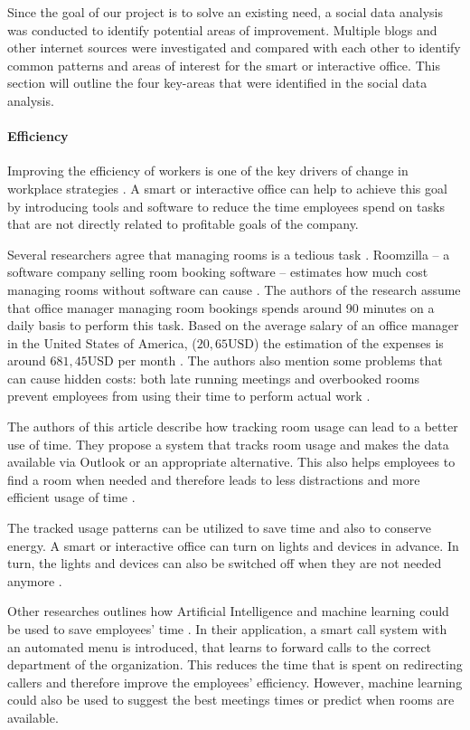 Since the goal of our project is to solve an existing need, a social data analysis was conducted to 
identify potential areas of improvement. Multiple blogs and other internet sources were investigated 
and compared with each other to identify common patterns and areas of interest for the smart or 
interactive office. This section will outline the four key-areas that were identified in the social 
data analysis.

\paragraph{Efficiency}
\label{sec:sda-efficiency}
Improving the efficiency of workers is one of the key drivers of change in workplace strategies 
 \cite{hub13}. A smart or interactive office can help to achieve this goal by introducing tools and software to reduce the time employees spend on tasks that are not directly related to profitable 
goals of the company.

Several researchers agree that managing rooms is a tedious task \cite{iotagenda} \cite{roomzilla9}. 
Roomzilla -- a software company selling room booking software -- estimates how 
much cost managing rooms without software can cause \cite{roomzilla9}. The authors of the research assume that office manager managing room bookings spends around 90 minutes on a daily basis to perform this task. Based on the average salary of an office 
manager in the United States of America, (\(20,65\text{USD}\)) the estimation of the expenses is around \(681,45\text{USD}\) 
per month \cite{roomzilla9}. The authors also mention some problems that can cause hidden costs: both late running 
meetings and overbooked rooms prevent employees from using their time to perform actual work \cite{roomzilla9}. 

The authors of this article describe how tracking room usage can lead to a better use of 
time. They propose a system that tracks room usage and makes the data available via Outlook or an 
appropriate alternative. This also helps employees to find a room when needed and therefore leads to 
less distractions and more efficient usage of time \cite{iotagenda}.

The tracked usage patterns can be utilized to save time and also to conserve energy. A smart or 
interactive office can turn on lights and devices in advance. In turn, the lights and devices can 
also be switched off when they are not needed anymore \cite{hbcommunications}.

Other researches outlines how Artificial Intelligence and machine learning could be used to save employees' 
time \cite{hbcommunications}. In their application, a smart call system with an automated menu is introduced, that learns to forward calls 
to the correct department of the organization. This reduces the time that is spent on redirecting callers and 
therefore improve the employees' efficiency. However, machine learning could also be used to suggest 
the best meetings times or predict when rooms are available.

